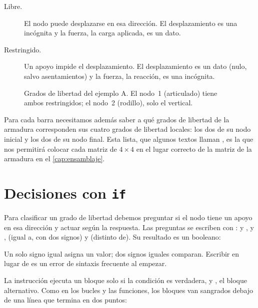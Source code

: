 \begin{description}
  \item[Libre.] El nodo puede desplazarse en esa dirección. El desplazamiento
    es una incógnita y la fuerza, la carga aplicada, es un dato.
  \item[Restringido.] Un apoyo impide el desplazamiento. El desplazamiento es
    un dato (nulo, salvo asentamientos) y la fuerza, la reacción, es una
    incógnita.
\end{description}

\begin{figure}[ht]
  \centering
  \caption{Grados de libertad del ejemplo A. El nodo~1 (articulado) tiene
    ambos restringidos; el nodo~2 (rodillo), solo el vertical.}
  \label{fig:ejemplo_a_gdl}
\end{figure}

Para cada barra necesitamos además saber a qué grados de libertad de la
armadura corresponden sus cuatro grados de libertad locales: los dos de su
nodo inicial y los dos de su nodo final. Esta lista, que algunos textos
llaman , es la que nos
permitirá colocar cada matriz de $4\times4$ en el lugar correcto de la matriz
de la armadura en el \cref{cap:ensamblaje}.

\section{Decisiones con \texttt{if}}\label{sec:if}

Para clasificar un grado de libertad debemos preguntar si el nodo tiene un
apoyo en esa dirección y actuar según la respuesta. Las preguntas se escriben
con : \py{>} y \py{<}, \py{>=} y \py{<=},
\py{==} (igual a, con dos signos) y \py{!=} (distinto de). Su resultado es un
booleano:

\begin{cuidado}
Un solo signo igual asigna un valor; dos signos iguales comparan. Escribir
 en lugar de  es un error de sintaxis
frecuente al empezar.
\end{cuidado}

La instrucción  ejecuta un bloque solo si la condición es verdadera,
y , el bloque alternativo. Como en los bucles y las funciones, los
bloques van sangrados debajo de una línea que termina en dos puntos:

